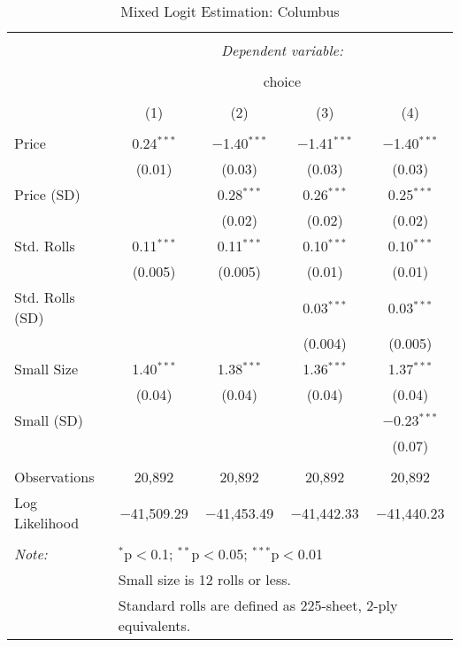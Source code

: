 
\begin{table}[!htbp] \centering 
  \caption{Mixed Logit Estimation: Columbus} 
  \label{tab:mnlColumbusRandCoefNoObsHet} 
\begin{tabular}{@{\extracolsep{5pt}}lcccc} 
\\[-1.8ex]\hline 
\hline \\[-1.8ex] 
 & \multicolumn{4}{c}{\textit{Dependent variable:}} \\ 
\cline{2-5} 
\\[-1.8ex] & \multicolumn{4}{c}{choice} \\ 
\\[-1.8ex] & (1) & (2) & (3) & (4)\\ 
\hline \\[-1.8ex] 
 Price & 0.24$^{***}$ & $-$1.40$^{***}$ & $-$1.41$^{***}$ & $-$1.40$^{***}$ \\ 
  & (0.01) & (0.03) & (0.03) & (0.03) \\ 
  Price (SD) &  & 0.28$^{***}$ & 0.26$^{***}$ & 0.25$^{***}$ \\ 
  &  & (0.02) & (0.02) & (0.02) \\ 
  Std. Rolls & 0.11$^{***}$ & 0.11$^{***}$ & 0.10$^{***}$ & 0.10$^{***}$ \\ 
  & (0.005) & (0.005) & (0.01) & (0.01) \\ 
  Std. Rolls (SD) &  &  & 0.03$^{***}$ & 0.03$^{***}$ \\ 
  &  &  & (0.004) & (0.005) \\ 
  Small Size & 1.40$^{***}$ & 1.38$^{***}$ & 1.36$^{***}$ & 1.37$^{***}$ \\ 
  & (0.04) & (0.04) & (0.04) & (0.04) \\ 
  Small (SD) &  &  &  & $-$0.23$^{***}$ \\ 
  &  &  &  & (0.07) \\ 
 \hline \\[-1.8ex] 
Observations & 20,892 & 20,892 & 20,892 & 20,892 \\ 
Log Likelihood & $-$41,509.29 & $-$41,453.49 & $-$41,442.33 & $-$41,440.23 \\ 
\hline 
\hline \\[-1.8ex] 
\textit{Note:}  & \multicolumn{4}{l}{$^{*}$p$<$0.1; $^{**}$p$<$0.05; $^{***}$p$<$0.01} \\ 
 & \multicolumn{4}{l}{Small size is 12 rolls or less.} \\ 
 & \multicolumn{4}{l}{Standard rolls are defined as 225-sheet, 2-ply equivalents.} \\ 
\end{tabular} 
\end{table} 
